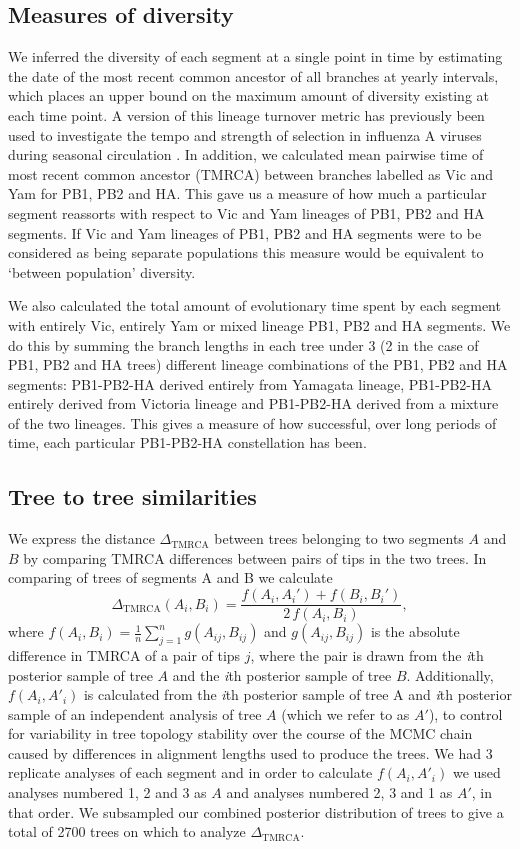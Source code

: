 \documentclass[11pt,oneside,letterpaper]{article}
\newcommand{\dtmrca}{\Delta_\mathrm{TMRCA}}
\begin{document}
\subsection*{Measures of diversity}
We inferred the diversity of each segment at a single point in time by estimating the date of the most recent common ancestor of all branches at yearly intervals, which places an upper bound on the maximum amount of diversity existing at each time point.
A version of this lineage turnover metric has previously been used to investigate the tempo and strength of selection in influenza A viruses during seasonal circulation \citep{bedford2011}.
In addition, we calculated mean pairwise time of most recent common ancestor (TMRCA) between branches labelled as Vic and Yam for PB1, PB2 and HA.
This gave us a measure of how much a particular segment reassorts with respect to Vic and Yam lineages of PB1, PB2 and HA segments.
If Vic and Yam lineages of PB1, PB2 and HA segments were to be considered as being separate populations this measure would be equivalent to `between population' diversity.

We also calculated the total amount of evolutionary time spent by each segment with entirely Vic, entirely Yam or mixed lineage PB1, PB2 and HA segments.
We do this by summing the branch lengths in each tree under 3 (2 in the case of PB1, PB2 and HA trees) different lineage combinations of the PB1, PB2 and HA segments: PB1-PB2-HA derived entirely from Yamagata lineage, PB1-PB2-HA entirely derived from Victoria lineage and PB1-PB2-HA derived from a mixture of the two lineages.
This gives a measure of how successful, over long periods of time, each particular PB1-PB2-HA constellation has been.

\subsection*{Tree to tree similarities}

We express the distance $\dtmrca$ between trees belonging to two segments $A$ and $B$ by comparing TMRCA differences between pairs of tips in the two trees.
In comparing of trees of segments A and B we calculate
\begin{equation}
\dtmrca(A_i, B_i) = \frac{f(A_i, A_i') + f(B_i, B_i')}{2 \, f(A_i, B_i)},
\end{equation}
where $f(A_i, B_i) = \frac{1}{n}\sum_{j=1}^n g(A_{ij}, B_{ij})$ and $g(A_{ij},B_{ij})$ is the absolute difference in TMRCA of a pair of tips $j$, where the pair is drawn from the \textit{i}th posterior sample of tree $A$ and the \textit{i}th posterior sample of tree $B$.
Additionally, $f(A_i,A'_i)$ is calculated from the \textit{i}th posterior sample of tree A and \textit{i}th posterior sample of an independent analysis of tree $A$ (which we refer to as $A'$), to control for variability in tree topology stability over the course of the MCMC chain caused by differences in alignment lengths used to produce the trees.
We had 3 replicate analyses of each segment and in order to calculate $f(A_i,A'_i)$ we used analyses numbered 1, 2 and 3 as $A$ and analyses numbered 2, 3 and 1 as $A'$, in that order.
We subsampled our combined posterior distribution of trees to give a total of 2700 trees on which to analyze $\dtmrca$.
\end{document}
